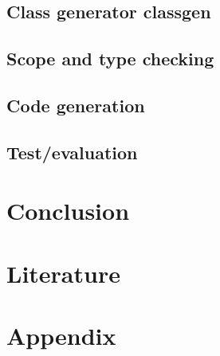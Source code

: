 	\section{Class generator classgen}
	\section{Scope and type checking}
	\section{Code generation}

\renewcommand{\ind}[1]{}
\section{Test/evaluation}

\renewcommand{\ind}[1]{}
\chapter{Conclusion}



\chapter{Literature}
\begingroup
	\raggedright
	{}	%
\endgroup


\newpage
\listoffixmes	%

\clearforchapter
\chapter{Appendix}
\appendix	%


\renewcommand{\ind}[1]{}

